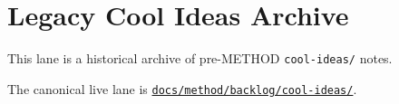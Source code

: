 \chapter{Legacy Cool Ideas Archive}\label{record-389}

\smallskip

This lane is a historical archive of pre-METHOD \texttt{c\allowbreak{}o\allowbreak{}o\allowbreak{}l\allowbreak{}-\allowbreak{}i\allowbreak{}d\allowbreak{}e\allowbreak{}a\allowbreak{}s\allowbreak{}/} notes.

The canonical live lane is \href{https://github.com/flyingrobots/bijou/blob/cbd70612140e7a450d764b3c7be1c6af878b99bc/docs/method/graveyard/method/backlog/cool-ideas/README.md}{\texttt{d\allowbreak{}o\allowbreak{}c\allowbreak{}s\allowbreak{}/\allowbreak{}m\allowbreak{}e\allowbreak{}t\allowbreak{}h\allowbreak{}o\allowbreak{}d\allowbreak{}/\allowbreak{}b\allowbreak{}a\allowbreak{}c\allowbreak{}k\allowbreak{}l\allowbreak{}o\allowbreak{}g\allowbreak{}/\allowbreak{}c\allowbreak{}o\allowbreak{}o\allowbreak{}l\allowbreak{}-\allowbreak{}i\allowbreak{}d\allowbreak{}e\allowbreak{}a\allowbreak{}s\allowbreak{}/}}.

